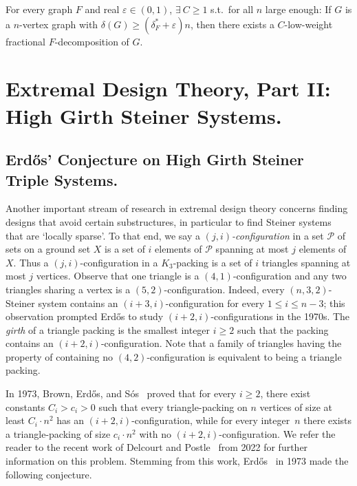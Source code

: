 \documentclass[twoside,leqno]{article}
\begin{document}
\begin{thm}\label{thm:LowWeightDecomposition}
    For every graph $F$ and real $\varepsilon\in (0,1)$, $\exists~C\geq 1$ s.t.~for all $n$ large enough: If $G$ is a $n$-vertex graph with $\delta(G)\geq (\delta^*_F+\varepsilon)n$, then there exists a $C$-low-weight fractional $F$-decomposition of $G$.
\end{thm}

\section{Extremal Design Theory, Part II: High Girth Steiner Systems.}


\subsection{Erd\H{o}s' Conjecture on High Girth Steiner Triple Systems.}

Another important stream of research in extremal design theory concerns finding designs that avoid certain substructures, in particular to find Steiner systems that are `locally sparse'. To that end, we say a {\em $(j,i)$-configuration} in a set $\mathcal{P}$ of sets on a ground set $X$ is a set of $i$ elements of $\mathcal{P}$ spanning at most $j$ elements of $X$. Thus a $(j,i)$-configuration in a $K_3$-packing is a set of $i$ triangles spanning at most $j$ vertices. Observe that one triangle is a $(4, 1)$-configuration and any two triangles sharing a vertex is a $(5,2)$-configuration. Indeed, every $(n,3,2)$-Steiner system contains an $(i+3,i)$-configuration for every $1 \le i \le n-3$; this observation prompted Erd\H{o}s to study $(i+2,i)$-configurations in the 1970s. The \textit{girth} of a triangle packing is the smallest integer $i\ge 2$ such that the packing contains an $(i+2, i)$-configuration. Note that a family of triangles having the property of containing no $(4,2)$-configuration is equivalent to being a triangle packing. 

In 1973, Brown, Erd\H{o}s, and S\'{o}s~\cite{BES73} proved that for every $i\geq 2$, there exist constants $C_i>c_i> 0$ such
that every triangle-packing on $n$ vertices of size at least $C_i\cdot n^2$ has an $(i+2,i)$-configuration, while for every integer~$n$ there exists a triangle-packing of size $c_i\cdot n^2$ with no $(i+2,i)$-configuration. We refer the reader to the recent work of Delcourt and Postle~\cite{DP22BES} from 2022 for further information on this problem. Stemming from this work, Erd\H{o}s~\cite{E73} in 1973 made the following conjecture.
\end{document}
